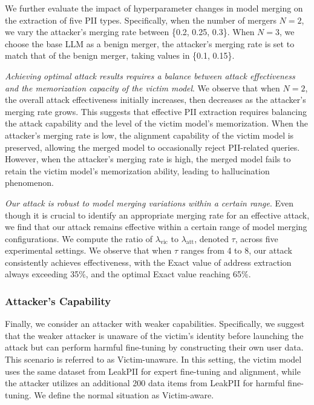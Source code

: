 We further evaluate the impact of hyperparameter changes in model merging on the extraction of five PII types. Specifically, when the number of mergers $N=2$, we vary the attacker's merging rate between \{0.2, 0.25, 0.3\}. When $N=3$, we choose the base LLM as a benign merger, the attacker's merging rate is set to match that of the benign merger, taking values in \{0.1, 0.15\}.

\textit{Achieving optimal attack results requires a balance between attack effectiveness and the memorization capacity of the victim model}. We observe that when $N=2$, the overall attack effectiveness initially increases, then decreases as the attacker's merging rate grows. This suggests that effective PII extraction requires balancing the attack capability and the level of the victim model's memorization. When the attacker's merging rate is low, the alignment capability of the victim model is preserved, allowing the merged model to occasionally reject PII-related queries. However, when the attacker's merging rate is high, the merged model fails to retain the victim model's memorization ability, leading to hallucination phenomenon.

\textit{Our attack is robust to model merging variations within a certain range}. Even though it is crucial to identify an appropriate merging rate for an effective attack, we find that our attack remains effective within a certain range of model merging configurations. We compute the ratio of $\lambda_\text{vic}$ to $\lambda_\text{att}$, denoted $\tau$, across five experimental settings. We observe that when $\tau$ ranges from 4 to 8, our attack consistently achieves effectiveness, with the Exact value of address extraction always exceeding 35\%, and the optimal Exact value reaching 65\%.


\subsubsection{Attacker's Capability}

Finally, we consider an attacker with weaker capabilities. Specifically, we suggest that the weaker attacker is unaware of the victim's identity before launching the attack but can perform harmful fine-tuning by constructing their own user data. This scenario is referred to as Victim-unaware. In this setting, the victim model uses the same dataset from LeakPII for expert fine-tuning and alignment, while the attacker utilizes an additional 200 data items from LeakPII for harmful fine-tuning. We define the normal situation as Victim-aware.

